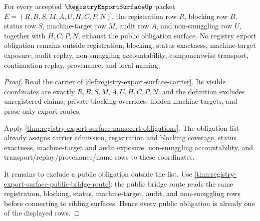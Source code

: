 \begin{theorem}
\label{thm:registry-export-surface-obligation-rows}
For every accepted $\RegistryExportSurfaceUp$ packet $E=(R,B,S,M,A,U,H,C,P,N)$, the registration row $R$, blocking row $B$, status row $S$, machine-target row $M$, audit row $A$, and non-smuggling row $U$, together with $H,C,P,N$, exhaust the public obligation surface. No registry export obligation remains outside registration, blocking, status exactness, machine-target exposure, audit replay, non-smuggling accountability, componentwise transport, continuation replay, provenance, and local naming.
\end{theorem}
\begin{proof}
Read the carrier of \autoref{def:registry-export-surface-carrier}. Its visible coordinates are exactly $R,B,S,M,A,U,H,C,P,N$, and the definition excludes unregistered claims, private blocking overrides, hidden machine targets, and prose-only export routes.

Apply \autoref{thm:registry-export-surface-namecert-obligations}. The obligation list already assigns carrier admission, registration and blocking coverage, status exactness, machine-target and audit exposure, non-smuggling accountability, and transport/replay/provenance/name rows to these coordinates.

It remains to exclude a public obligation outside the list. Use \autoref{thm:registry-export-surface-public-bridge-route}: the public bridge route reads the same registration, blocking, status, machine-target, audit, and non-smuggling rows before connecting to sibling surfaces. Hence every public obligation is already one of the displayed rows.
\end{proof}

